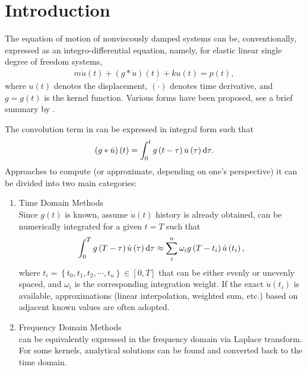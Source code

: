 \section{Introduction}
The equation of motion of nonviscously damped systems can be, conventionally, expressed as an integro-differential equation, namely, for elastic linear single degree of freedom systems,
\begin{gather}\label{eq:single_eom}
m\ddot{u}\left(t\right)+\left(g*\dot{u}\right)\left(t\right)+ku\left(t\right)=p\left(t\right),
\end{gather}
where $u(t)$ denotes the displacement, $\dot{(\cdot)}$ denotes time derivative, and $g=g(t)$ is the kernel function. Various forms have been proposed, see a brief summary by \citet[][Table 1.1]{Adhikari2014}.

The convolution term in  can be expressed in integral form such that
\begin{gather}\label{eq:conv}
\left(g*\dot{u}\right)\left(t\right)=\int_0^tg\left(t-\tau\right)\dot{u}\left(\tau\right)\mathrm{d}\tau.
\end{gather}
Approaches to compute (or approximate, depending on one's perspective) it can be divided into two main categories:
\begin{enumerate}
\item Time Domain Methods\\
Since $g(t)$ is known, assume $\dot{u}(t)$ history is already obtained,  can be numerically integrated for a given $t=T$ such that
\begin{gather}
\int_0^Tg\left(T-\tau\right)\dot{u}\left(\tau\right)\mathrm{d}\tau\approx\sum_i^n\omega_ig\left(T-t_i\right)\dot{u}\left(t_i\right),
\end{gather}
where $t_i=\left\{t_0,t_1,t_2,\cdots,t_n\right\}\in[0,T]$ that can be either evenly or unevenly spaced, and $\omega_i$ is the corresponding integration weight. If the exact $\dot{u}(t_i)$ is available, approximations (linear interpolation, weighted sum, etc.) based on adjacent known values are often adopted.
\item Frequency Domain Methods\\
 can be equivalently expressed in the frequency domain via Laplace transform. For some kernels, analytical solutions can be found and converted back to the time domain.
\end{enumerate}